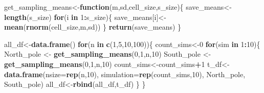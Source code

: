 \documentclass[
]{book}
\newenvironment{Shaded}{\begin{snugshade}}{\end{snugshade}}
\newcommand{\AttributeTok}[1]{\textcolor[rgb]{0.13,0.29,0.53}{#1}}
\newcommand{\ControlFlowTok}[1]{\textcolor[rgb]{0.13,0.29,0.53}{\textbf{#1}}}
\newcommand{\DecValTok}[1]{\textcolor[rgb]{0.00,0.00,0.81}{#1}}
\newcommand{\FunctionTok}[1]{\textcolor[rgb]{0.13,0.29,0.53}{\textbf{#1}}}
\newcommand{\NormalTok}[1]{#1}
\newcommand{\OtherTok}[1]{\textcolor[rgb]{0.56,0.35,0.01}{#1}}
\newcommand{\SpecialCharTok}[1]{\textcolor[rgb]{0.81,0.36,0.00}{\textbf{#1}}}
\begin{document}
\begin{Shaded}
\begin{Highlighting}[]
\NormalTok{get\_sampling\_means}\OtherTok{\textless{}{-}}\ControlFlowTok{function}\NormalTok{(m,sd,cell\_size,s\_size)\{}
\NormalTok{  save\_means}\OtherTok{\textless{}{-}}\FunctionTok{length}\NormalTok{(s\_size)}
  \ControlFlowTok{for}\NormalTok{(i }\ControlFlowTok{in} \DecValTok{1}\SpecialCharTok{:}\NormalTok{s\_size)\{}
\NormalTok{    save\_means[i]}\OtherTok{\textless{}{-}}\FunctionTok{mean}\NormalTok{(}\FunctionTok{rnorm}\NormalTok{(cell\_size,m,sd))}
\NormalTok{  \}}
  \FunctionTok{return}\NormalTok{(save\_means)}
\NormalTok{\}}

\NormalTok{all\_df}\OtherTok{\textless{}{-}}\FunctionTok{data.frame}\NormalTok{()}
\ControlFlowTok{for}\NormalTok{(n }\ControlFlowTok{in} \FunctionTok{c}\NormalTok{(}\DecValTok{1}\NormalTok{,}\DecValTok{5}\NormalTok{,}\DecValTok{10}\NormalTok{,}\DecValTok{100}\NormalTok{))\{}
\NormalTok{  count\_sims}\OtherTok{\textless{}{-}}\DecValTok{0}
  \ControlFlowTok{for}\NormalTok{(sim }\ControlFlowTok{in} \DecValTok{1}\SpecialCharTok{:}\DecValTok{10}\NormalTok{)\{}
\NormalTok{    North\_pole }\OtherTok{\textless{}{-}} \FunctionTok{get\_sampling\_means}\NormalTok{(}\DecValTok{0}\NormalTok{,}\DecValTok{1}\NormalTok{,n,}\DecValTok{10}\NormalTok{)}
\NormalTok{    South\_pole }\OtherTok{\textless{}{-}} \FunctionTok{get\_sampling\_means}\NormalTok{(}\DecValTok{0}\NormalTok{,}\DecValTok{1}\NormalTok{,n,}\DecValTok{10}\NormalTok{)}
\NormalTok{      count\_sims}\OtherTok{\textless{}{-}}\NormalTok{count\_sims}\SpecialCharTok{+}\DecValTok{1}
\NormalTok{      t\_df}\OtherTok{\textless{}{-}}\FunctionTok{data.frame}\NormalTok{(}\AttributeTok{nsize=}\FunctionTok{rep}\NormalTok{(n,}\DecValTok{10}\NormalTok{),}
                       \AttributeTok{simulation=}\FunctionTok{rep}\NormalTok{(count\_sims,}\DecValTok{10}\NormalTok{),}
\NormalTok{                       North\_pole,}
\NormalTok{                       South\_pole)}
\NormalTok{      all\_df}\OtherTok{\textless{}{-}}\FunctionTok{rbind}\NormalTok{(all\_df,t\_df)}
\NormalTok{  \}}
\NormalTok{\}}



\end{Highlighting}
\end{Shaded}
\end{document}
